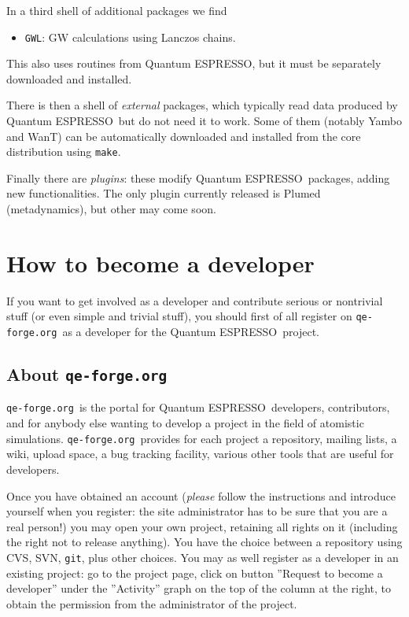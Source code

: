 \documentclass[12pt,a4paper]{article}
\def\qe{{\sc Quantum ESPRESSO}}
\def\qeforge{\texttt{qe-forge.org}}
\begin{document}
In a third shell of additional packages we find
\begin{itemize}
\item \texttt{GWL}: GW calculations using Lanczos chains.
\end{itemize}
This also uses routines from \qe, but it must be separately 
downloaded and installed.

There is then a shell of {\em external} packages, which typically
read data produced by \qe\ but do not need it to work. Some of them
(notably Yambo and WanT) can be automatically downloaded and installed
from the core distribution using \texttt{make}.

Finally there are {\em plugins}: these modify \qe\ packages, adding
new functionalities. The only plugin currently released is Plumed
(metadynamics), but other may come soon.

\section{How to become a developer}

If you want to get involved as a developer and contribute serious
or nontrivial stuff (or even simple and trivial stuff), you should
first of all register on \qeforge\ as a developer for the \qe\ 
project.

\subsection{About \qeforge}

\qeforge\ is the portal for \qe\ developers, contributors,
and for anybody else wanting to develop a project in the
field of atomistic simulations. \qeforge\ provides for
each project a repository, mailing lists, a wiki, upload 
space, a bug tracking facility, various other tools that 
are useful for developers.

Once you have obtained an account ({\em please} follow the 
instructions and introduce yourself when you register: the 
site administrator has to be sure that you are a real person!)
you may open your own project, retaining all rights on it 
(including the right not to release anything). You have the 
choice between a repository using CVS, SVN, \texttt{git}, 
plus other choices. You may as well register as a developer 
in an existing project: go to the project page, click on
button ''Request to become a developer'' under the ''Activity''
graph on the top of the column at the right, to obtain the permission 
from the administrator of the project.
\end{document}
